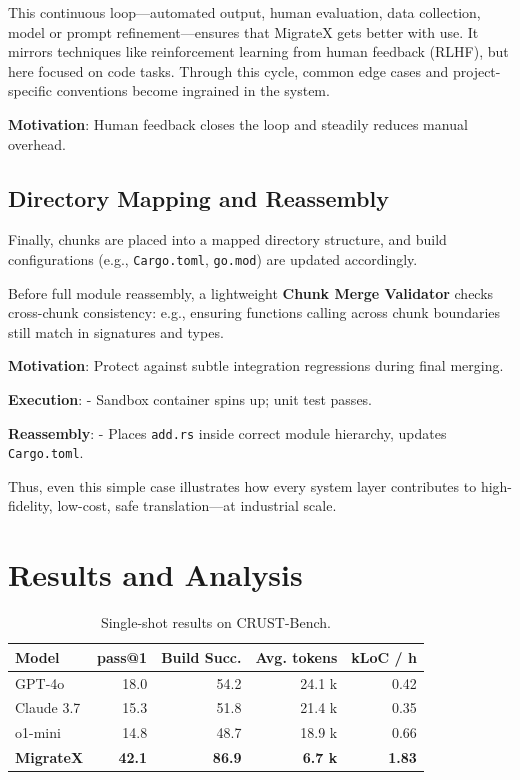 \documentclass[twocolumn]{article}
\begin{document}
This continuous loop—automated output, human evaluation, data collection, model or prompt refinement—ensures that MigrateX gets better with use. It mirrors techniques like reinforcement learning from human feedback (RLHF), but here focused on code tasks. Through this cycle, common edge cases and project-specific conventions become ingrained in the system.


\textbf{Motivation}: Human feedback closes the loop and steadily reduces manual overhead.

\subsection{Directory Mapping and Reassembly}

Finally, chunks are placed into a mapped directory structure, and build configurations (e.g., \texttt{Cargo.toml}, \texttt{go.mod}) are updated accordingly.

Before full module reassembly, a lightweight \textbf{Chunk Merge Validator} checks cross-chunk consistency: e.g., ensuring functions calling across chunk boundaries still match in signatures and types.

\textbf{Motivation}: Protect against subtle integration regressions during final merging.

\textbf{Execution}:
- Sandbox container spins up; unit test passes.

\textbf{Reassembly}:
- Places \texttt{add.rs} inside correct module hierarchy, updates \texttt{Cargo.toml}.

Thus, even this simple case illustrates how every system layer contributes to high-fidelity, low-cost, safe translation---at industrial scale.
    
    \section{Results and Analysis}
    \label{sec:results}
    
    \begin{table}[htbp]
        \centering
        \caption{Single-shot results on CRUST-Bench.}
        \label{tab:pass}
        \begin{tabular}{lrrrr}
          \toprule
          \textbf{Model} & pass@1 & Build Succ. & Avg. tokens & kLoC / h \\
          \midrule
          GPT-4o            & 18.0 & 54.2 & 24.1 k & 0.42 \\
          Claude 3.7        & 15.3 & 51.8 & 21.4 k & 0.35 \\
          o1-mini           & 14.8 & 48.7 & 18.9 k & 0.66 \\
          \textbf{MigrateX} & \textbf{42.1} & \textbf{86.9} & \textbf{6.7 k} & \textbf{1.83} \\
          \bottomrule
        \end{tabular}
      \end{table}
    
\end{document}
